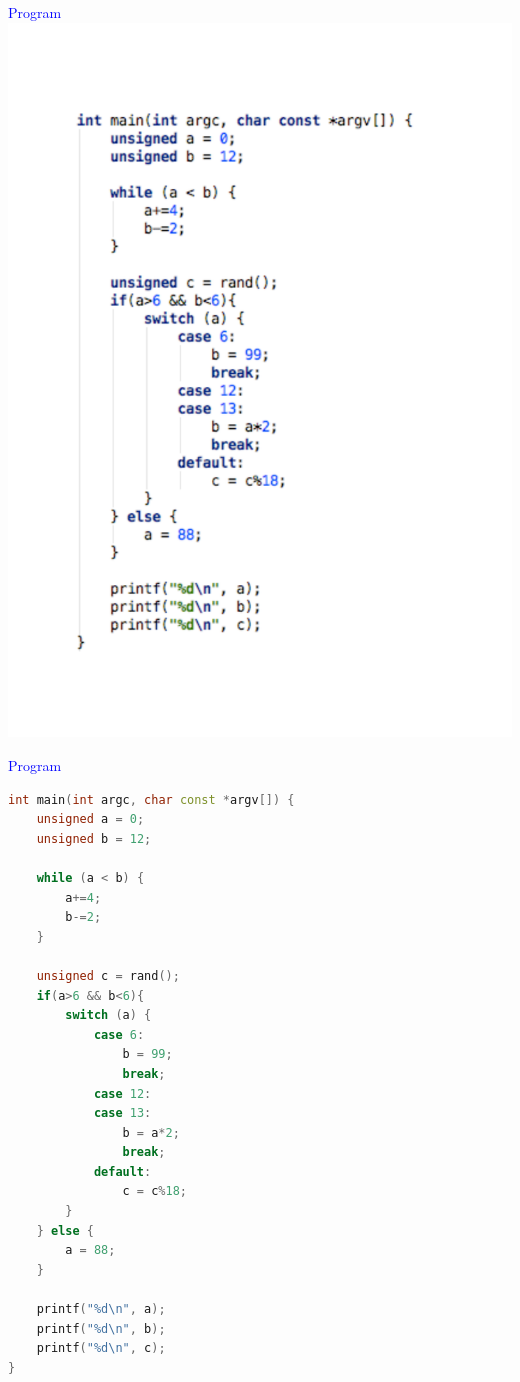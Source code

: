 \begin{frame}[fragile]{\textcolor{blue}{Program}}
\includegraphics[scale=0.45]{src/example_c.pdf}
\end{frame}
\begin{frame}[fragile]{\textcolor{blue}{Program}}
\begin{footnotesize}
\begin{lstlisting}[language=C++]
int main(int argc, char const *argv[]) {
    unsigned a = 0;
    unsigned b = 12;

    while (a < b) {
        a+=4;
        b-=2;
    }

    unsigned c = rand();
    if(a>6 && b<6){
        switch (a) {
            case 6:
                b = 99;
                break;
            case 12:
            case 13:
                b = a*2;
                break;
            default:
                c = c%18;
        }
    } else {
        a = 88;
    }

    printf("%d\n", a);
    printf("%d\n", b);
    printf("%d\n", c);
}
\end{lstlisting}
\end{footnotesize}
\end{frame}

